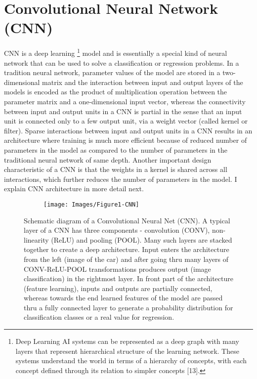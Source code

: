 \documentclass [11pt,letterpaper ,twoside ,openany ]{report}
\begin{document}
     \section{Convolutional Neural Network (CNN)}
     CNN is a deep learning \footnote {Deep Learning AI systems can be represented as a deep graph with many layers that represent hierarchical structure of the learning network. These systems understand the world in terms of a hierarchy of concepts, with each concept defined through its relation to simpler concepts [13].} model and is essentially a special kind of neural network that can be used to solve a classification or regression problems. In a tradition neural network, parameter values of the model are stored in a two-dimensional matrix and the interaction between input and output layers of the models is encoded as the product of multiplication operation between the parameter matrix and a one-dimensional input vector, whereas the connectivity between input and output units in a CNN is partial in the sense that an input unit is connected only to a few output unit, via a weight vector (called kernel or filter). Sparse interactions between input and output units in a CNN results in an architecture where training is much more efficient because of reduced number of parameters in the model as compared to the number of parameters in the traditional neural network of same depth. Another important design characteristic of a CNN is that the weights in a kernel is shared across all interactions, which further reduces the number of parameters in the model. I explain CNN architecture in more detail next. 

    \begin{figure}[h]
      \centering
      \begin{subfigure}[b]{1.00\linewidth}
        \texttt{[image: Images/Figure1-CNN]}
      \end{subfigure}
      \caption{Schematic diagram of a Convolutional Neural Net (CNN). A typical layer of a CNN has three components - convolution (CONV), non-linearity (ReLU) and pooling (POOL). Many such layers are stacked together to create a deep architecture. Input enters the architecture from the left (image of the car) and after going thru many layers of CONV-ReLU-POOL transformations produces output (image classification) in the rightmost layer. In front part of the architecture (feature learning), inputs and outputs are partially connected, whereas towards the end learned features of the model are passed thru a fully connected layer to generate a probability distribution for classification classes or a real value for regression.}
      \label{fig:cnn}
    \end{figure}
\end{document}
